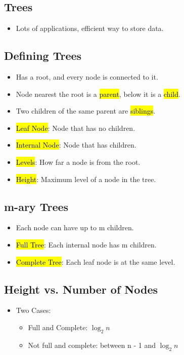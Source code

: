 \subsection{Trees}
\begin{itemize}
    \item Lots of applications, efficient way to store data.
\end{itemize}

\subsection{Defining Trees}
\begin{itemize}
    \item Has a root, and every node is connected to it.
    \item Node nearest the root is a \hl{parent}, below it is a \hl{child}.
    \item Two children of the same parent are \hl{siblings}.
    \item \hl{Leaf Node}: Node that has no children.
    \item \hl{Internal Node}: Node that has children.
    \item \hl{Levels}: How far a node is from the root.
    \item \hl{Height}: Maximum level of a node in the tree.
\end{itemize}

\subsection{m-ary Trees}
\begin{itemize}
    \item Each node can have up to m children.
    \item \hl{Full Tree}: Each internal node has m children.
    \item \hl{Complete Tree}: Each leaf node is at the same level.
\end{itemize}

\subsection{Height vs. Number of Nodes}
\begin{itemize}
    \item Two Cases: \begin{itemize}
        \item Full and Complete: $\log_2{n}$
        \item Not full and complete: between n - 1 and $\log_2{n}$
    \end{itemize}
\end{itemize}

